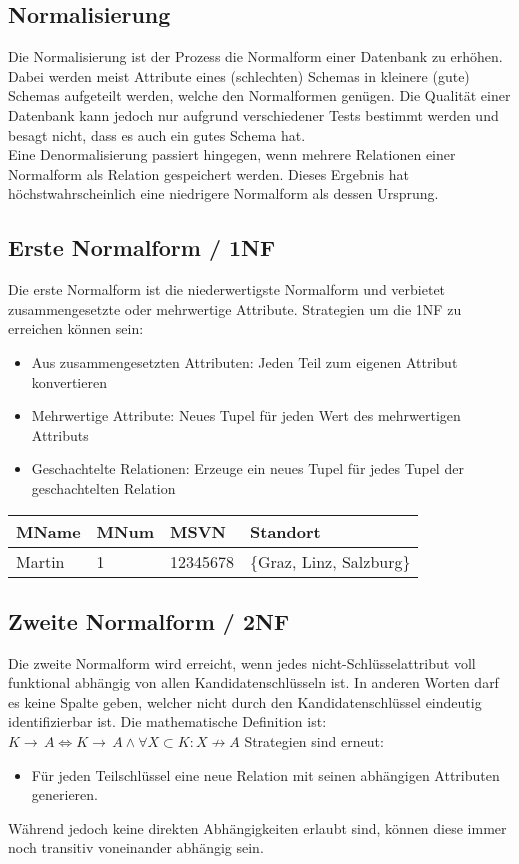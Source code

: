 \documentclass{article}
\begin{document}
	\subsection{Normalisierung}
	Die Normalisierung ist der Prozess die Normalform einer Datenbank zu erhöhen. Dabei werden meist Attribute eines (schlechten) Schemas in kleinere (gute) Schemas aufgeteilt werden, welche den Normalformen genügen. Die Qualität einer Datenbank kann jedoch nur aufgrund verschiedener Tests bestimmt werden und besagt nicht, dass es auch ein gutes Schema hat. \\
	Eine Denormalisierung passiert hingegen, wenn mehrere Relationen einer Normalform als Relation gespeichert werden. Dieses Ergebnis hat höchstwahrscheinlich eine niedrigere Normalform als dessen Ursprung.
	\subsection{Erste Normalform / 1NF}
	Die erste Normalform ist die niederwertigste Normalform und verbietet zusammengesetzte oder mehrwertige Attribute. Strategien um die 1NF zu erreichen können sein:
	\begin{itemize}
		\item{Aus zusammengesetzten Attributen: Jeden Teil zum eigenen Attribut konvertieren}
		\item{Mehrwertige Attribute: Neues Tupel für jeden Wert des mehrwertigen Attributs}
		\item{Geschachtelte Relationen: Erzeuge ein neues Tupel für jedes Tupel der geschachtelten Relation}
	\end{itemize}
	\begin{tabular}{| l | l | l | l |}
		\toprule
		MName & MNum & MSVN & Standort \\ \midrule
		Martin & 1 & 12345678 & \{Graz, Linz, Salzburg\} \\ \hline
		
		\bottomrule
	\end{tabular}
	\subsection{Zweite Normalform / 2NF}
	Die zweite Normalform wird erreicht, wenn jedes nicht-Schlüsselattribut voll funktional abhängig von allen Kandidatenschlüsseln ist. In anderen Worten darf es keine Spalte geben, welcher nicht durch den Kandidatenschlüssel eindeutig identifizierbar ist. Die mathematische Definition ist: $K \to\, A \iff K \to\, A \land \forall X \subset K:X \not\to A$
	Strategien sind erneut:
	\begin{itemize}
		\item{Für jeden Teilschlüssel eine neue Relation mit seinen abhängigen Attributen generieren.}
	\end{itemize}
	Während jedoch keine direkten Abhängigkeiten erlaubt sind, können diese immer noch transitiv voneinander abhängig sein.
\end{document}
